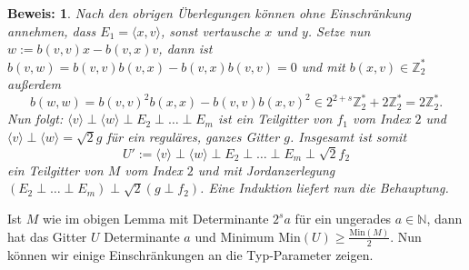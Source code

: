 \documentclass[12pt,a4paper,halfparskip,headsepline,bibtotocnumbered]{scrreprt}
\theoremstyle{nummermitklammern}
\theoremstyle{nonumberbreak}
\newtheorem{beweis}{Beweis:}
\newcommand{\N}{\mathbb{N}}
\newcommand{\Z}{\mathbb{Z}}
\newcommand{\Min}{\text{Min}}
\begin{document}
\begin{beweis}
	Nach den obrigen Überlegungen können ohne Einschränkung annehmen, dass\linebreak
	$E_1 = \langle x,v \rangle$, sonst vertausche $x$ und $y$. Setze nun $w := b(v,v) x - b(v,x) v$, dann ist $b(v,w) = b(v,v) b(v,x) - b(v,x) b(v,v) = 0$ und mit $b(x,v) \in \Z_2^\ast$ außerdem 	\begin{equation*}
		b(w,w) = b(v,v)^2 b(x,x) - b(v,v) b(x,v)^2 \in 2^{2+s} \Z_2^\ast + 2 \Z_2^\ast = 2 \Z_2^\ast.
	\end{equation*}
	Nun folgt: $\langle v \rangle \perp  \langle w \rangle \perp E_2 \perp \dots \perp E_m$ ist ein Teilgitter von $f_1$ vom Index $2$ und
	$\langle v \rangle \perp \langle w \rangle = \sqrt{2} g$ für ein reguläres, ganzes Gitter $g$. Insgesamt ist somit
	\begin{equation*}
		U' := \langle v \rangle \perp \langle w \rangle \perp E_2 \perp \dots \perp E_m \perp \sqrt{2}f_2
	\end{equation*}
	ein Teilgitter von $M$ vom Index $2$ und mit Jordanzerlegung $\left( E_2 \perp \dots \perp E_m \right) \perp \sqrt{2} \left( g \perp f_2 \right)$. Eine Induktion liefert nun die Behauptung.
\end{beweis}

Ist $M$ wie im obigen Lemma mit Determinante $2^s a$ für ein ungerades $a \in \N$, dann hat das Gitter $U$ Determinante $a$ und Minimum $\Min(U) \geq \frac{\Min(M)}{2}$.
Nun können wir einige Einschränkungen an die Typ-Parameter zeigen.
\end{document}
